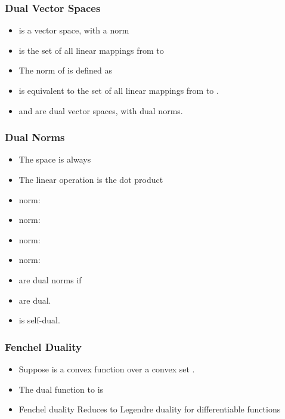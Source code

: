 \documentclass[handout]{beamer}
\begin{document}
\begin{frame}
\frametitle{Dual Vector Spaces}

\begin{itemize}
\item {} is a vector space, with a norm 
\item {} is the set of all linear mappings from  to
  \item
  The norm of  is defined as
\item {} is equivalent to the set of all linear mappings from  to
  .
\item {} and  are dual vector spaces, with dual norms. 
\end{itemize}
\end{frame}

\begin{frame}
\frametitle{Dual Norms}
\begin{itemize}
  \item The space is always 
  \item The linear operation is the dot product \R{$\vu \cdot \vv$}
\item {} norm: 
\item {} norm: 
\item {} norm: 
\item {} norm: 
\item {} are dual norms if 
\item {} are dual.
\item {} is self-dual. 
\end{itemize}
\end{frame}

\begin{frame}
\frametitle{Fenchel Duality}
\begin{itemize}
\item Suppose  is a convex function over a convex set .
\item The dual function to  is
  \item Fenchel duality Reduces to Legendre duality for differentiable functions

\end{itemize}
\end{frame}
\end{document}

